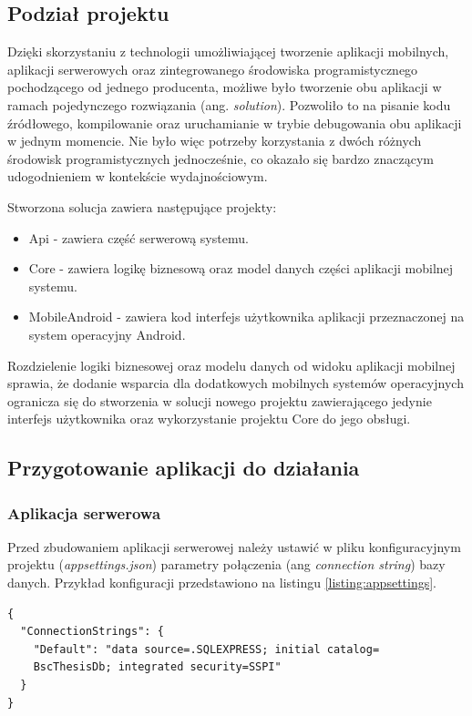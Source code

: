 \subsection{Podział projektu}
Dzięki skorzystaniu z technologii umożliwiającej tworzenie aplikacji mobilnych, aplikacji serwerowych oraz zintegrowanego środowiska programistycznego pochodzącego od jednego producenta, możliwe było tworzenie obu aplikacji w ramach pojedynczego rozwiązania (ang. \textit{solution}). Pozwoliło to na pisanie kodu źródłowego, kompilowanie oraz uruchamianie w trybie debugowania obu aplikacji w jednym momencie. Nie było więc potrzeby korzystania z dwóch różnych środowisk programistycznych jednocześnie, co okazało się bardzo znaczącym udogodnieniem w kontekście wydajnościowym.

Stworzona solucja zawiera następujące projekty:
\begin{itemize}
\item{Api} - zawiera część serwerową systemu.
\item{Core} - zawiera logikę biznesową oraz model danych części aplikacji mobilnej systemu.
\item{MobileAndroid} - zawiera kod interfejs użytkownika aplikacji przeznaczonej na system operacyjny Android.
\end{itemize}
Rozdzielenie logiki biznesowej oraz modelu danych od widoku aplikacji mobilnej sprawia, że dodanie wsparcia dla dodatkowych mobilnych systemów operacyjnych ogranicza się do stworzenia w solucji nowego projektu zawierającego jedynie interfejs użytkownika oraz wykorzystanie projektu Core do jego obsługi.

\subsection{Przygotowanie aplikacji do działania}
\subsubsection{Aplikacja serwerowa}
Przed zbudowaniem aplikacji serwerowej należy ustawić w pliku konfiguracyjnym projektu (\textit{appsettings.json}) parametry połączenia (ang \textit{connection string}) bazy danych. Przykład konfiguracji przedstawiono na listingu \ref{listing:appsettings}.

\begin{lstlisting}[caption={Plik konfiguracyjny aplikacji serwerowej},label=listing:appsettings]
{
  "ConnectionStrings": {
    "Default": "data source=.SQLEXPRESS; initial catalog=
    BscThesisDb; integrated security=SSPI"
  }
}
\end{lstlisting}

